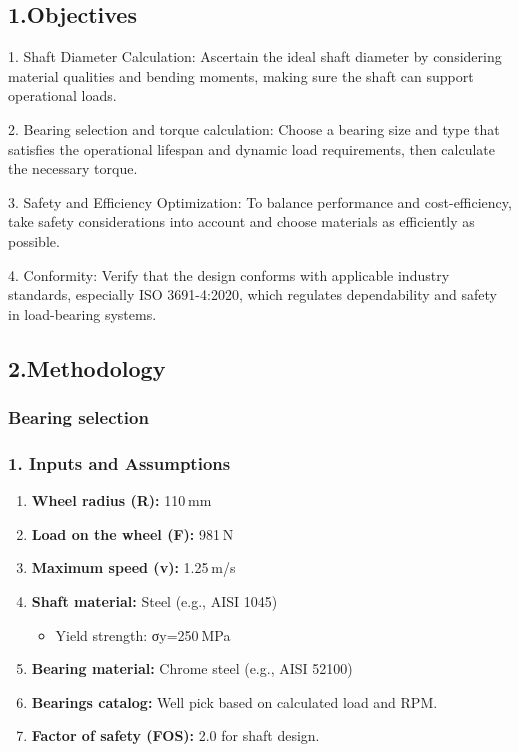 \documentclass[../../main]{subfiles}
\begin{document}
\subsection{\texorpdfstring{\textbf{1.Objectives}}{1.Objectives}}\label{objectives}

1. Shaft Diameter Calculation: Ascertain the ideal shaft diameter by
considering material qualities and bending moments, making sure the
shaft can support operational loads.

2. Bearing selection and torque calculation: Choose a bearing size and
type that satisfies the operational lifespan and dynamic load
requirements, then calculate the necessary torque.

3. Safety and Efficiency Optimization: To balance performance and
cost-efficiency, take safety considerations into account and choose
materials as efficiently as possible.

4. Conformity: Verify that the design conforms with applicable industry
standards, especially ISO 3691-4:2020, which regulates dependability and
safety in load-bearing systems.

\subsection{\texorpdfstring{\textbf{2.Methodology}}{2.Methodology}}\label{methodology}

\subsubsection{\texorpdfstring{\textbf{Bearing
selection}}{Bearing selection}}\label{bearing-selection}

\subsubsection{\texorpdfstring{\textbf{1. Inputs and
Assumptions}}{1. Inputs and Assumptions}}\label{inputs-and-assumptions}

\begin{enumerate}
\def\labelenumi{\arabic{enumi}.}
\item
  \textbf{Wheel radius (R):} 110 mm
\item
  \textbf{Load on the wheel (F):} 981 N
\item
  \textbf{Maximum speed (v):} 1.25 m/s
\item
  \textbf{Shaft material:} Steel (e.g., AISI 1045)

  \begin{itemize}
  \item
    Yield strength: σy=250 MPa
  \end{itemize}
\item
  \textbf{Bearing material:} Chrome steel (e.g., AISI 52100)
\item
  \textbf{Bearings catalog:} We\textquotesingle ll pick based on
  calculated load and RPM.
\item
  \textbf{Factor of safety (FOS):} 2.0 for shaft design.
\end{enumerate}
\end{document}
